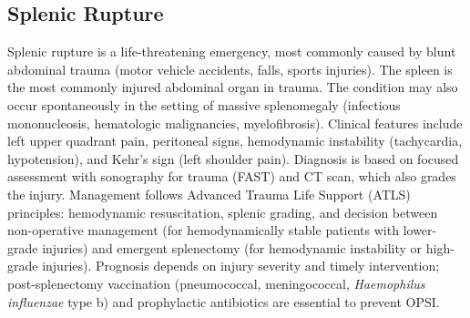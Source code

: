 \subsection{Splenic Rupture}
\label{sec:Splenic Rupture}
Splenic rupture is a life-threatening emergency, most commonly caused by blunt abdominal trauma (motor vehicle accidents, falls, sports injuries). The spleen is the most commonly injured abdominal organ in trauma. The condition may also occur spontaneously in the setting of massive splenomegaly (infectious mononucleosis, hematologic malignancies, myelofibrosis). Clinical features include left upper quadrant pain, peritoneal signs, hemodynamic instability (tachycardia, hypotension), and Kehr's sign (left shoulder pain). Diagnosis is based on focused assessment with sonography for trauma (FAST) and CT scan, which also grades the injury. Management follows Advanced Trauma Life Support (ATLS) principles: hemodynamic resuscitation, splenic grading, and decision between non-operative management (for hemodynamically stable patients with lower-grade injuries) and emergent splenectomy (for hemodynamic instability or high-grade injuries). Prognosis depends on injury severity and timely intervention; post-splenectomy vaccination (pneumococcal, meningococcal, \textit{Haemophilus influenzae} type b) and prophylactic antibiotics are essential to prevent OPSI.


